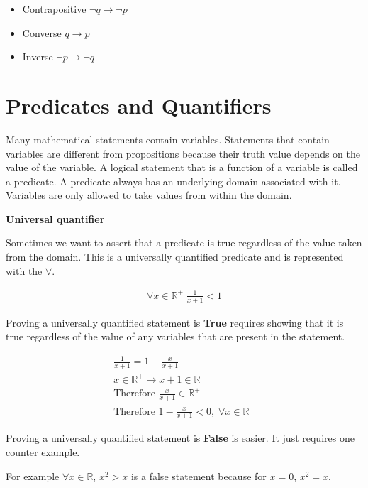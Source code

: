 \documentclass[12pt]{article}
\begin{document}
\begin{itemize}
\item Contrapositive $\neg q \rightarrow \neg p$
\item Converse $q \rightarrow p$
\item Inverse $\neg p \rightarrow \neg q$
\end{itemize}

\section*{Predicates and Quantifiers}
Many mathematical statements contain variables. Statements that contain variables are different from propositions because their truth value depends on the value of the variable. A logical statement that is a function of a variable is called a predicate. A predicate always has an underlying domain associated with it. Variables are only allowed to take values from within the domain.

\medskip

\textbf{Universal quantifier}

Sometimes we want to assert that a predicate is true regardless of the value taken from the domain. This is a universally quantified predicate and is represented with the $\forall$.

\begin{align*}
\forall x \in \mathbb{R^+} \; \frac{1}{x+1} < 1
\end{align*}

Proving a universally quantified statement is \textbf{True} requires showing that it is true regardless of the value of any variables that are present in the statement.

\begin{align*}
\frac{1}{x+1} = 1 - \frac{x}{x+1} \\
x \in \mathbb{R^+} \rightarrow x + 1 \in \mathbb{R^+} \\
\text{Therefore } \frac{x}{x+1} \in \mathbb{R^+}\\
\text{Therefore } 1 - \frac{x}{x+1} < 0, \; \forall x \in \mathbb{R^+} 
\end{align*}

Proving a universally quantified statement is \textbf{False} is easier. It just requires one counter example.

For example $\forall x \in \mathbb{R}, \, x^2 > x$ is a false statement because for $x = 0$, $x^2 = x$.

\medskip
\end{document}

